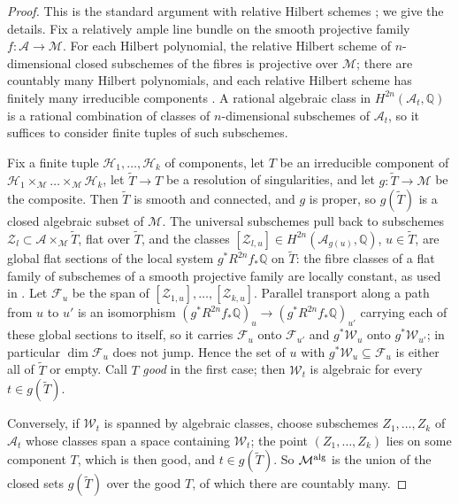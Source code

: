 \documentclass[11pt]{amsart}
\theoremstyle{definition}
\theoremstyle{remark}
\newcommand{\Q}{\mathbb Q}
\newcommand{\cM}{\mathcal M}
\begin{document}
\begin{proof}
This is the standard argument with relative Hilbert schemes \cite[\S3.3.2, pp.~90--94, and the proofs of Theorems~7.19 and 8.26]{VoisinII}; we give the details. Fix a relatively ample line bundle on the smooth projective family $f\colon\mathcal A\to\cM$. For each Hilbert polynomial, the relative Hilbert scheme of $n$-dimensional closed subschemes of the fibres is projective over $\cM$; there are countably many Hilbert polynomials, and each relative Hilbert scheme has finitely many irreducible components \cite[pp.~90--91]{VoisinII}. A rational algebraic class in $H^{2n}(\mathcal A_t,\Q)$ is a rational combination of classes of $n$-dimensional subschemes of $\mathcal A_t$, so it suffices to consider finite tuples of such subschemes.

Fix a finite tuple $\mathcal H_1,\dots,\mathcal H_k$ of components, let $T$ be an irreducible component of $\mathcal H_1\times_\cM\dots\times_\cM\mathcal H_k$, let $\widetilde T\to T$ be a resolution of singularities, and let $g\colon\widetilde T\to\cM$ be the composite. Then $\widetilde T$ is smooth and connected, and $g$ is proper, so $g(\widetilde T)$ is a closed algebraic subset of $\cM$. The universal subschemes pull back to subschemes $\mathcal Z_l\subset\mathcal A\times_\cM\widetilde T$, flat over $\widetilde T$, and the classes $[\mathcal Z_{l,u}]\in H^{2n}(\mathcal A_{g(u)},\Q)$, $u\in\widetilde T$, are global flat sections of the local system $g^*R^{2n}f_*\Q$ on $\widetilde T$: the fibre classes of a flat family of subschemes of a smooth projective family are locally constant, as used in \cite[proof of Theorem~3.33, p.~94]{VoisinII}. Let $\mathcal F_u$ be the span of $[\mathcal Z_{1,u}],\dots,[\mathcal Z_{k,u}]$. Parallel transport along a path from $u$ to $u'$ is an isomorphism $(g^*R^{2n}f_*\Q)_u\to(g^*R^{2n}f_*\Q)_{u'}$ carrying each of these global sections to itself, so it carries $\mathcal F_u$ onto $\mathcal F_{u'}$ and $g^*\mathcal W_u$ onto $g^*\mathcal W_{u'}$; in particular $\dim\mathcal F_u$ does not jump. Hence the set of $u$ with $g^*\mathcal W_u\subseteq\mathcal F_u$ is either all of $\widetilde T$ or empty. Call $T$ \emph{good} in the first case; then $\mathcal W_t$ is algebraic for every $t\in g(\widetilde T)$.

Conversely, if $\mathcal W_t$ is spanned by algebraic classes, choose subschemes $Z_1,\dots,Z_k$ of $\mathcal A_t$ whose classes span a space containing $\mathcal W_t$; the point $(Z_1,\dots,Z_k)$ lies on some component $T$, which is then good, and $t\in g(\widetilde T)$. So $\cM^{\rm alg}$ is the union of the closed sets $g(\widetilde T)$ over the good $T$, of which there are countably many.
\end{proof}
\end{document}
